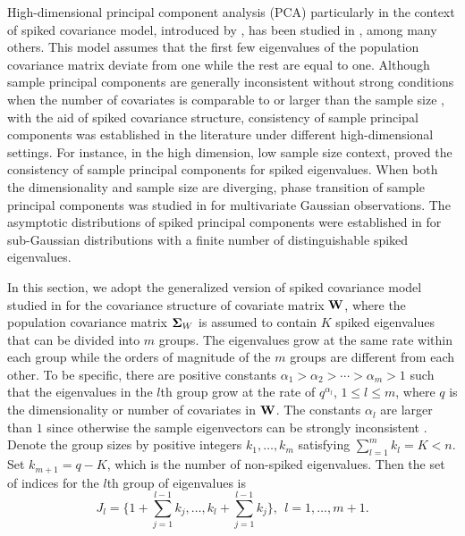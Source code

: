 \documentclass{statsoc}
\newcommand{\bW}{\mbox{\bf W}}
\newcommand{\bSig}{\mbox{\boldmath $\Sigma$}}
\begin{document}
High-dimensional principal component analysis (PCA) particularly in the context of spiked covariance model, introduced by \cite{Johnstone2001}, has been studied in \cite{Paul2007, Jung2009, Shen2016, Wang2017}, among many others. This model assumes that the first few eigenvalues of the population covariance matrix deviate from one while the rest are equal to one. Although sample principal components are generally inconsistent without strong conditions when the number of covariates is comparable to or larger than the sample size \citep{Johnstone2009}, with the aid of spiked covariance structure, consistency of sample principal components was established in the literature under different high-dimensional settings. For instance, in the high dimension, low sample size context, \cite{Jung2009} proved the consistency of sample principal components for spiked eigenvalues. When both the dimensionality and sample size are diverging, phase transition of sample principal components was studied in \cite{Paul2007, Shen2016} for multivariate Gaussian observations. The asymptotic distributions of spiked principal components were established in \cite{Wang2017} for sub-Gaussian distributions with a finite number of distinguishable spiked eigenvalues.



In this section, we adopt the generalized version of spiked covariance model studied in \cite{Jung2009} for the covariance structure of covariate matrix $\bW$, where the population covariance matrix $\bSig_W$ is assumed to contain $K$ spiked eigenvalues that can be divided into $m$ groups. The eigenvalues grow at the same rate within each group while the orders of magnitude of the $m$ groups are different from each other. To be specific, there are positive constants $\alpha_1 > \alpha_2 > \cdots > \alpha_m > 1$ such that the eigenvalues in the $l$th group grow at the rate of $q^{\alpha_l}$, $1 \leq l \leq m$, where $q$ is the dimensionality or number of covariates in $\bW$. The constants $\alpha_l$ are larger than $1$ since otherwise the sample eigenvectors can be strongly inconsistent \citep{Jung2009}. Denote the group sizes by positive integers $k_1, \dots, k_m$ satisfying $\sum_{l = 1}^m k_l = K < n$. Set $k_{m + 1} = q - K$, which is the number of non-spiked eigenvalues. Then the set of indices for the $l$th group of eigenvalues is
\begin{equation} \label{index}
J_l = \Big\{1 + \sum_{j = 1}^{l - 1}k_j, \dots, k_l + \sum_{j = 1}^{l - 1}k_j\Big\}, \ \ l = 1, \dots, m + 1.
\end{equation}
\end{document}
